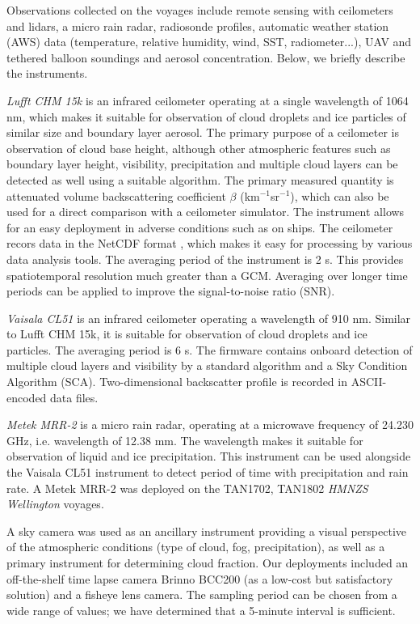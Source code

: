 Observations collected on the voyages include remote sensing with ceilometers and lidars,
a micro rain radar, radiosonde profiles, automatic weather station (AWS) data (temperature, relative humidity,
wind, SST, radiometer...), UAV and tethered balloon soundings and
aerosol concentration. Below, we briefly describe the instruments.

\textit{Lufft CHM 15k} is an infrared ceilometer operating at a single wavelength of
1064 nm, which makes it suitable for observation of cloud droplets and
ice particles of similar size and boundary layer aerosol.
The primary purpose of a ceilometer
is observation of cloud base height, although other atmospheric features
such as boundary layer height, visibility, precipitation and multiple
cloud layers can be detected as well using a suitable algorithm. The
primary measured quantity is attenuated volume backscattering coefficient
$\beta$ (km$^{-1}$sr$^{-1}$), which
can also be used for a direct comparison with a ceilometer simulator.
The instrument allows for an easy deployment
in adverse conditions such as on ships.
The ceilometer recors data in the NetCDF format \citep{rew2006},
which makes it easy
for processing by various data analysis tools.
The averaging period of the instrument is 2 s. This provides spatiotemporal
resolution much greater than a GCM. Averaging over longer time periods can
be applied to improve the signal-to-noise ratio (SNR).

\textit{Vaisala CL51} is an infrared ceilometer operating a
wavelength of 910 nm. Similar to Lufft CHM 15k, it is suitable for observation
of cloud droplets and ice particles. The averaging period is 6 s.
The firmware contains onboard detection of multiple cloud layers and
visibility by a standard algorithm and a Sky Condition Algorithm (SCA).
Two-dimensional backscatter profile is recorded in ASCII-encoded data files.

\textit{Metek MRR-2} is a micro rain radar, operating at a microwave frequency of
24.230 GHz, i.e. wavelength of 12.38 mm. The wavelength makes it suitable
for observation of liquid and ice precipitation. This instrument can
be used alongside the Vaisala CL51 instrument to detect period of time with
precipitation and rain rate. A Metek MRR-2 was deployed on the TAN1702, TAN1802
\textit{HMNZS Wellington} voyages.

A sky camera was used as an ancillary instrument providing a visual
perspective of the atmospheric conditions (type of cloud, fog,
precipitation), as well as a primary instrument for determining cloud fraction.
Our deployments included
an off-the-shelf time lapse camera Brinno BCC200 (as a low-cost but
satisfactory solution) and a fisheye lens camera.
The sampling period can be chosen from a wide range of values; we have
determined that a 5-minute interval is sufficient.

